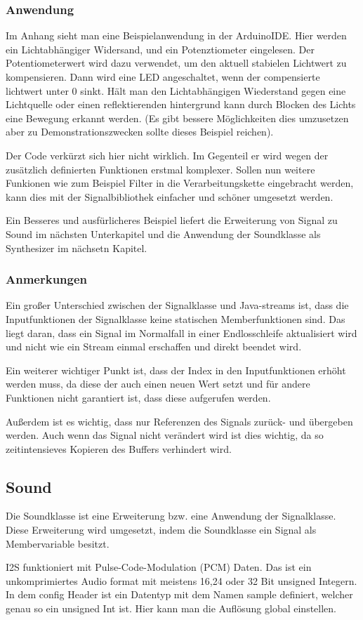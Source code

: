 
\subsubsection{Anwendung}
Im Anhang sieht man eine Beispielanwendung in der ArduinoIDE. Hier werden ein
Lichtabhängiger Widersand, und ein Potenztiometer eingelesen. Der Potentiometerwert
wird dazu verwendet, um den aktuell stabielen Lichtwert zu kompensieren. Dann wird
eine LED angeschaltet, wenn der compensierte lichtwert unter 0 sinkt. Hält man den 
Lichtabhängigen Wiederstand gegen eine Lichtquelle oder einen reflektierenden 
hintergrund kann durch Blocken des Lichts eine Bewegung erkannt werden. 
(Es gibt bessere Möglichkeiten dies umzusetzen aber zu Demonstrationszwecken 
sollte dieses Beispiel reichen).

Der Code verkürzt sich hier nicht wirklich. Im Gegenteil er wird wegen der 
zusätzlich definierten Funktionen erstmal komplexer. Sollen nun weitere 
Funkionen wie zum Beispiel Filter in die Verarbeitungskette eingebracht werden, 
kann dies mit der Signalbibliothek einfacher und schöner umgesetzt werden.

Ein Besseres und ausfürlicheres Beispiel liefert die Erweiterung von Signal zu 
Sound im nächsten Unterkapitel und die Anwendung der Soundklasse als Synthesizer
im nächsetn Kapitel.

\subsubsection{Anmerkungen}
Ein großer Unterschied zwischen der Signalklasse und Java-streams ist, dass 
die Inputfunktionen der Signalklasse keine statischen Memberfunktionen sind.
Das liegt daran, dass ein Signal im Normalfall in einer Endlosschleife 
aktualisiert wird und nicht wie ein Stream einmal erschaffen und direkt 
beendet wird. 

Ein weiterer wichtiger Punkt ist, dass der Index in den Inputfunktionen erhöht
werden muss, da diese der auch einen neuen Wert setzt und für andere Funktionen 
nicht garantiert ist, dass diese aufgerufen werden.

Außerdem ist es wichtig, dass nur Referenzen des Signals zurück- und übergeben werden. 
Auch wenn das Signal nicht verändert wird ist dies wichtig, da so zeitintensieves
Kopieren des Buffers verhindert wird.

\subsection{Sound}

Die Soundklasse ist eine Erweiterung bzw. eine Anwendung der Signalklasse. 
Diese Erweiterung wird umgesetzt, indem die Soundklasse ein Signal als 
Membervariable besitzt.

 I2S funktioniert mit 
Pulse-Code-Modulation (PCM) Daten. Das ist ein unkomprimiertes Audio format mit
meistens 16,24 oder 32 Bit unsigned Integern.  In dem config Header ist ein 
Datentyp mit dem Namen sample definiert, welcher genau so ein unsigned Int ist.
Hier kann man die Auflösung global einstellen.

